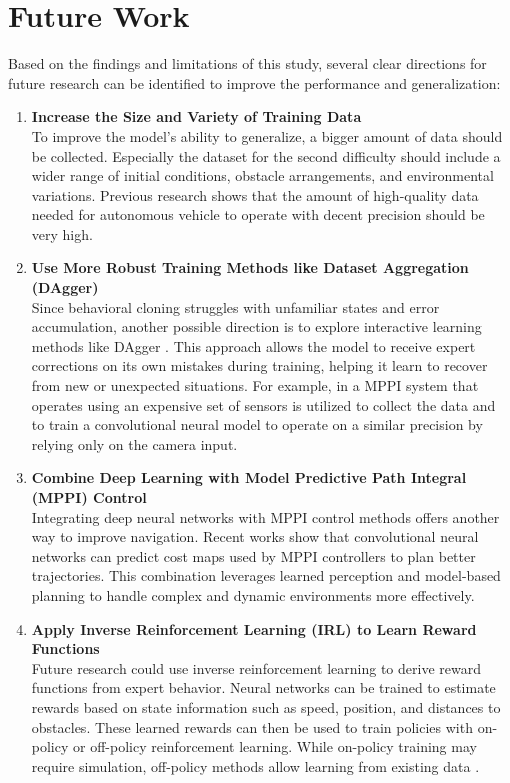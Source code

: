 \section{Future Work}
\label{sec:future_work}

Based on the findings and limitations of this study, several clear directions for future research can be identified to improve the performance and generalization:

\begin{enumerate}
  \item \textbf{Increase the Size and Variety of Training Data} \\
    To improve the model’s ability to generalize, a bigger amount of data should be collected. Especially the dataset for the second difficulty should include a wider range of initial conditions, obstacle arrangements, and environmental variations. Previous research \autocite{KALRA2016182} shows that the amount of high-quality data needed for autonomous vehicle to operate with decent precision should be very high.

  \item \textbf{Use More Robust Training Methods like Dataset Aggregation (DAgger)} \\
    Since behavioral cloning struggles with unfamiliar states and error accumulation, another possible direction is to explore interactive learning methods like DAgger \autocite{ross2011reduction}. This approach allows the model to receive expert corrections on its own mistakes during training, helping it learn to recover from new or unexpected situations. For example, in \autocite{pan2019agileautonomousdrivingusing} a MPPI system that operates using an expensive set of sensors is utilized to collect the data and to train a convolutional neural model to operate on a similar precision by relying only on the camera input.

  \item \textbf{Combine Deep Learning with Model Predictive Path Integral (MPPI) Control} \\
    Integrating deep neural networks with MPPI control methods offers another way to improve navigation. Recent works \autocite{lee2021approximateinversereinforcementlearning, drews2017aggressivedeepdrivingmodel} show that convolutional neural networks can predict cost maps used by MPPI controllers to plan better trajectories. This combination leverages learned perception and model-based planning to handle complex and dynamic environments more effectively.

  \item \textbf{Apply Inverse Reinforcement Learning (IRL) to Learn Reward Functions} \\
    Future research could use inverse reinforcement learning to derive reward functions from expert behavior. Neural networks can be trained to estimate rewards based on state information such as speed, position, and distances to obstacles. These learned rewards can then be used to train policies with on-policy or off-policy reinforcement learning. While on-policy training may require simulation, off-policy methods allow learning from existing data \autocite{arnob2020off}.

\end{enumerate}
